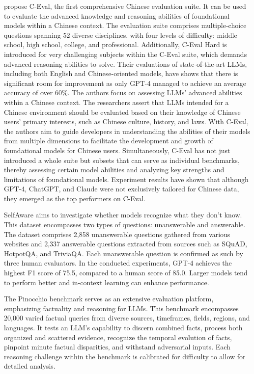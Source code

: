 \citet{C-Eval} propose C-Eval, the first comprehensive Chinese evaluation suite. It can be used to evaluate the advanced knowledge and reasoning abilities of foundational models within a Chinese context. The evaluation suite comprises multiple-choice questions spanning 52 diverse disciplines, with four levels of difficulty: middle school, high school, college, and professional. Additionally, C-Eval Hard is introduced for very challenging subjects within the C-Eval suite, which demands advanced reasoning abilities to solve. Their evaluations of state-of-the-art LLMs, including both English and Chinese-oriented models, have shows that there is significant room for improvement as only GPT-4 managed to achieve an average accuracy of over 60\%.
The authors focus on assessing LLMs' advanced abilities within a Chinese context. The researchers assert that LLMs intended for a Chinese environment should be evaluated based on their knowledge of Chinese users' primary interests, such as Chinese culture, history, and laws.
With C-Eval, the authors aim to guide developers in understanding the abilities of their models from multiple dimensions to facilitate the development and growth of foundational models for Chinese users. Simultaneously, C-Eval has not just introduced a whole suite but subsets that can serve as individual benchmarks, thereby assessing certain model abilities and analyzing key strengths and limitations of foundational models. Experiment results have shown that although GPT-4, ChatGPT, and Claude were not exclusively tailored for Chinese data, they emerged as the top performers on C-Eval.

SelfAware \citep{yin-etal-2023-large} aims to investigate whether models recognize what they don't know. This dataset encompasses two types of questions: unanswerable and answerable. The dataset comprises 2,858 unanswerable questions gathered from various websites and 2,337 answerable questions extracted from sources such as SQuAD, HotpotQA, and TriviaQA. Each unanswerable question is confirmed as such by three human evaluators. In the conducted experiments, GPT-4 achieves the highest F1 score of 75.5, compared to a human score of 85.0. Larger models tend to perform better and in-context learning can enhance performance.

The Pinocchio benchmark \citep{Pinocchio} serves as an extensive evaluation platform, emphasizing factuality and reasoning for LLMs. This benchmark encompasses 20,000 varied factual queries from diverse sources, timeframes, fields, regions, and languages. It tests an LLM's capability to discern combined facts, process both organized and scattered evidence, recognize the temporal evolution of facts, pinpoint minute factual disparities, and withstand adversarial inputs. Each reasoning challenge within the benchmark is calibrated for difficulty to allow for detailed analysis.


